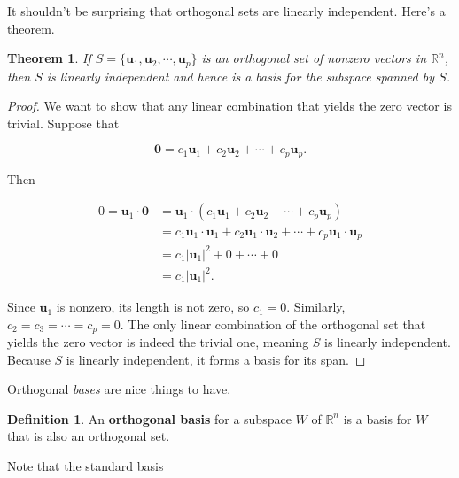 \documentclass[
]{book}
\newtheorem{theorem}{Theorem}[chapter]
\theoremstyle{definition}
\newtheorem{definition}{Definition}[chapter]
\theoremstyle{definition}
\theoremstyle{definition}
\theoremstyle{definition}
\theoremstyle{remark}
\begin{document}
It shouldn't be surprising that orthogonal sets are linearly independent. Here's a theorem.

\begin{theorembox}

\begin{theorem}
If \(S=\{\mathbf{u}_1,\mathbf{u}_2,\cdots,\mathbf{u}_p\}\) is an orthogonal set of nonzero vectors in \(\mathbb{R}^n\), then \(S\) is linearly independent and hence is a basis for the subspace spanned by \(S\).
\end{theorem}

\end{theorembox}

\begin{proof}
We want to show that any linear combination that yields the zero vector is trivial. Suppose that

\[\mathbf{0}=c_1\mathbf{u}_1+c_2\mathbf{u}_2+\cdots+c_p\mathbf{u}_p.\]

Then

\begin{align*}
0=\mathbf{u}_1\cdot \mathbf{0}&=\mathbf{u}_1\cdot(c_1\mathbf{u}_1+c_2\mathbf{u}_2+\cdots+c_p\mathbf{u}_p)\\
&=c_1\mathbf{u}_1\cdot\mathbf{u}_1+c_2\mathbf{u}_1\cdot\mathbf{u}_2+\cdots+c_p\mathbf{u}_1\cdot\mathbf{u}_p\\
&=c_1|\mathbf{u}_1|^2+0+\cdots+0\\
&=c_1|\mathbf{u}_1|^2.
\end{align*}

Since \(\mathbf{u}_1\) is nonzero, its length is not zero, so \(c_1=0\). Similarly, \(c_2=c_3=\cdots=c_p=0.\) The only linear combination of the orthogonal set that yields the zero vector is indeed the trivial one, meaning \(S\) is linearly independent. Because \(S\) is linearly independent, it forms a basis for its span.
\end{proof}

Orthogonal \emph{bases} are nice things to have.

\begin{defbox}

\begin{definition}
An \textbf{orthogonal basis} for a subspace \(W\) of \(\mathbb{R}^n\) is a basis for \(W\) that is also an orthogonal set.
\end{definition}

\end{defbox}

Note that the standard basis
\end{document}
